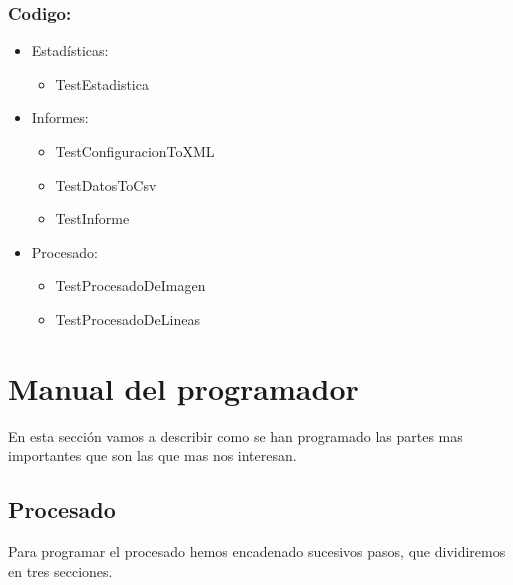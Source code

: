 \subsubsection{Codigo:}
\begin{itemize}
	\item Estadísticas:
		\begin{itemize}
			\item TestEstadistica
		\end{itemize}
	\item Informes:
		\begin{itemize}
			\item TestConfiguracionToXML
			\item TestDatosToCsv
			\item TestInforme
		\end{itemize}
	\item Procesado:
		\begin{itemize}
			\item TestProcesadoDeImagen
			\item TestProcesadoDeLineas
		\end{itemize}
\end{itemize}

\section{Manual del programador}
En esta sección vamos a describir como se han programado las partes mas importantes que son las que mas nos interesan.
\subsection{Procesado}
Para programar el procesado hemos encadenado sucesivos pasos, que dividiremos en tres secciones.

